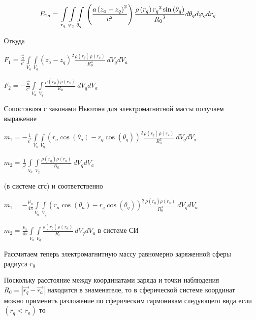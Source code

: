 \documentclass{article}
\begin{document}
	\[{E}_{1a}=\\
\int\limits_{{{r}_{q}}}\int\limits_{{{\varphi}_{q}}}\int\limits_{{{\theta}_{q}}}\\
\left( \frac{a\left( {{z}_{a}}-{{z}_{q}} \right)^2}{c^2} \right) \\
\frac{\rho \left( {{r}_{q}} \right){{r}_{q}}^{2}\sin \left( {{\theta }_{q}} \right)}{{{R}_{0}}^{3}}\\
d{{\theta }_{q}}d{{\varphi }_{q}}d{{r}_{q}}\]


Откуда

${{F}_{1}}=\frac{\overrightarrow{a}}{{{c}^{^{2}}}}\int\limits_{{{V}_{a}}}{\int\limits_{{{V}_{q}}}{\left( {{z}_{a}}-{{z}_{q}} \right)^2\frac{\rho \left( {{r}_{q}} \right)\rho \left( {{r}_{a}} \right)}{R_{0}^3}}}\ d{{V}_{q}}d{{V}_{a}}$


${{F}_{2}}=-\frac{\overrightarrow{a}}{{{c}^{^{2}}}}\int\limits_{{{V}_{a}}}{\int\limits_{{{V}_{q}}}{\frac{\rho \left( {{r}_{q}} \right)\rho \left( {{r}_{a}} \right)}{R_{0}}}}\ d{{V}_{q}}d{{V}_{a}}$

Сопоставляя с законами Ньютона для электромагнитной массы получаем выражение

$m_1= - \frac{1}{{{c}^{^{2}}}}\int\limits_{{{V}_{a}}}{\int\limits_{{{V}_{q}}}{\left( {{r}_{a}}\cos \left( {{\theta }_{a}} \right)-{{r}_{q}}\cos \left( {{\theta }_{q}} \right) \right)^2\frac{\rho \left( {{r}_{q}} \right)\rho \left( {{r}_{a}} \right)}{R_{0}^3}}}\ d{{V}_{q}}d{{V}_{a}}$


$m_2=\frac{1}{{{c}^{^{2}}}}\int\limits_{{{V}_{a}}}{\int\limits_{{{V}_{q}}}{\frac{\rho \left( {{r}_{q}} \right)\rho \left( {{r}_{a}} \right)}{R_{0}}}}\ d{{V}_{q}}d{{V}_{a}}$

 (в системе сгс)
 и соответственно

$m_1= - \frac{{{\mu }_{0}}}{4\pi } \int\limits_{{{V}_{a}}}{\int\limits_{{{V}_{q}}}{\left( {{r}_{a}}\cos \left( {{\theta }_{a}} \right)-{{r}_{q}}\cos \left( {{\theta }_{q}} \right) \right)^2\frac{\rho \left( {{r}_{q}} \right)\rho \left( {{r}_{a}} \right)}{R_{0}^3}}}\ d{{V}_{q}}d{{V}_{a}}$


 $m_2=\frac{{{\mu }_{0}}}{4\pi }\int\limits_{{{V}_{a}}}{\int\limits_{{{V}_{q}}}{\frac{\rho \left( {{r}_{q}} \right)\rho \left( {{r}_{a}} \right)}{R_{0}}}}\ d{{V}_{q}}d{{V}_{a}}$ в системе СИ

Рассчитаем теперь электромагнитную массу равномерно заряженной сферы радиуса ${{r}_{0}}$

Поскольку расстояние между координатами заряда и точки наблюдения ${{R}_{0}}=\left|\overrightarrow{r_{q}} - \overrightarrow{r_{a}}\right|$ находится в знаменателе, то в сферической системе координат можно применить разложение по сферическим гармоникам следующего вида  \cite{flugge} если $\left( {{r}_{q}}<{{r}_{a}} \right)$ то
\end{document}
